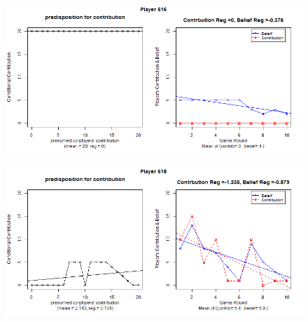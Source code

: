 \begin{figure}[!h]
	\includegraphics[scale=0.5]{images/appendixB/P616.png}
\end{figure}

\begin{figure}[!h]
	\includegraphics[scale=0.5]{images/appendixB/P618.png}
\end{figure}